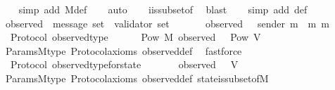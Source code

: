 \begin{isabellebody}
%
\isadelimproof
\ \ %
\endisadelimproof
%
\isatagproof
{}\isamarkupfalse%
\ {\isacharparenleft}simp\ add{\isacharcolon}\ M{\isacharunderscore}def{\isacharparenright}\isanewline
\ \ \isamarkupfalse%
\ auto\isanewline
\ \ \isamarkupfalse%
\ {\isasymSigma}i{\isacharunderscore}is{\isacharunderscore}subset{\isacharunderscore}of{\isacharunderscore}{\isasymSigma}\ \isamarkupfalse%
\ blast\isanewline
\ \ \isamarkupfalse%
\ {\isacharparenleft}simp\ add{\isacharcolon}\ {\isasymSigma}{\isacharunderscore}def{\isacharparenright}%
\endisatagproof
{\isafoldproof}%
%
\isadelimproof
\ \isanewline
%
\endisadelimproof
\isanewline
\isanewline
{}\isamarkupfalse%
\ observed\ {\isacharcolon}{\isacharcolon}\ {\isachardoublequoteopen}message\ set\ {\isasymRightarrow}\ validator\ set{\isachardoublequoteclose}\isanewline
\ \ \isanewline
\ \ \ \ {\isachardoublequoteopen}observed\ {\isasymsigma}\ {\isacharequal}\ {\isacharbraceleft}sender\ m\ {\isacharbar}\ m{\isachardot}\ m\ {\isasymin}\ {\isasymsigma}{\isacharbraceright}{\isachardoublequoteclose}\isanewline
\isanewline
{}\isamarkupfalse%
\ {\isacharparenleft}\ Protocol{\isacharparenright}\ observed{\isacharunderscore}type\ {\isacharcolon}\isanewline
\ \ {\isachardoublequoteopen}{\isasymforall}\ {\isasymsigma}\ {\isasymin}\ Pow\ M{\isachardot}\ observed\ {\isasymsigma}\ {\isasymin}\ Pow\ V{\isachardoublequoteclose}\isanewline
%
\isadelimproof
\ \ %
\endisadelimproof
%
\isatagproof
{}\isamarkupfalse%
\ Params{\isachardot}M{\isacharunderscore}type\ Protocol{\isacharunderscore}axioms\ observed{\isacharunderscore}def\ \isamarkupfalse%
\ fastforce%
\endisatagproof
{\isafoldproof}%
%
\isadelimproof
\isanewline
%
\endisadelimproof
\isanewline
{}\isamarkupfalse%
\ {\isacharparenleft}\ Protocol{\isacharparenright}\ observed{\isacharunderscore}type{\isacharunderscore}for{\isacharunderscore}state\ {\isacharcolon}\isanewline
\ \ {\isachardoublequoteopen}{\isasymforall}\ {\isasymsigma}\ {\isasymin}\ {\isasymSigma}{\isachardot}\ observed\ {\isasymsigma}\ {\isasymsubseteq}\ V{\isachardoublequoteclose}\isanewline
%
\isadelimproof
\ \ %
\endisadelimproof
%
\isatagproof
{}\isamarkupfalse%
\ Params{\isachardot}M{\isacharunderscore}type\ Protocol{\isacharunderscore}axioms\ observed{\isacharunderscore}def\ state{\isacharunderscore}is{\isacharunderscore}subset{\isacharunderscore}of{\isacharunderscore}M\ \isamarkupfalse%

\end{isabellebody}
